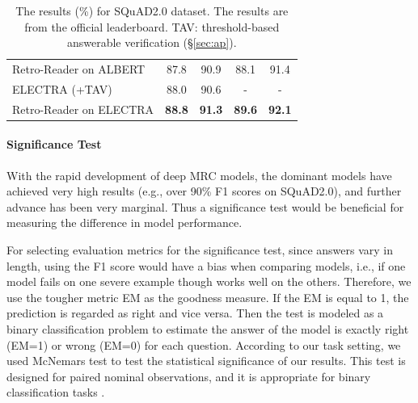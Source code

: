 \documentclass[letterpaper]{article} %
\begin{document}
\begin{table}
{\begin{tabular}{l c c c c }
			Retro-Reader on ALBERT & 87.8 & 90.9 & 88.1 & 91.4 \\
			ELECTRA (+TAV) & 88.0 & 90.6  & -  & - \\
			Retro-Reader on ELECTRA & \textbf{88.8} & \textbf{91.3} & \textbf{89.6} & \textbf{92.1} \\
			\bottomrule
		\end{tabular}
	}
	\caption{\label{tab:squad2.0} The results (\%) for SQuAD2.0 dataset. The results  are from the official leaderboard.  
	TAV: threshold-based answerable verification (\S\ref{sec:ap}). 
	}
\end{table}

\paragraph{Significance Test} With the rapid development of deep MRC models, the dominant models have achieved very high results (e.g., over 90\% F1 scores on SQuAD2.0), and further advance has been very marginal. %
Thus a significance test would be beneficial for measuring the difference in model performance. %

For selecting evaluation metrics for the significance test, since answers vary in length, using the F1 score would have a bias when comparing models, i.e., if one model fails on one severe example though works well on the others. Therefore, we use the tougher metric EM as the goodness measure. If the EM is equal to 1, the prediction is regarded as right and vice versa. Then the test is modeled as a binary classification problem to estimate the answer of the model is exactly right (EM=1) or wrong (EM=0) for each question. According to our task setting, we used McNemars test \cite{mcnemar1947note} to test the statistical significance of our results. This test is designed for paired nominal observations, and it is appropriate for binary classification tasks \cite{ziser2016neural}. 

\end{document}
